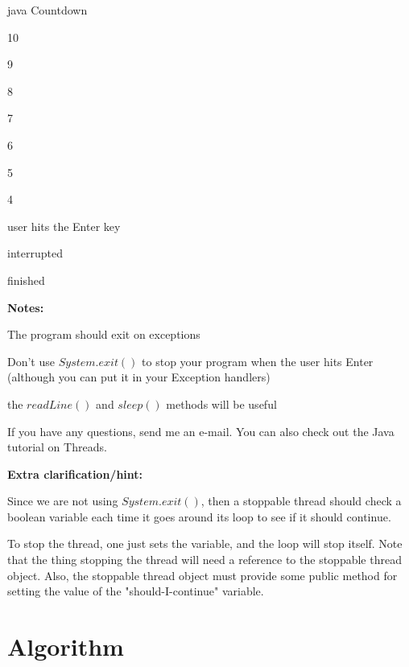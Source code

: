 \documentclass{article}
\begin{document}
java Countdown

10

9

8

7

6

5

4

user hits the Enter key

interrupted

finished

\textbf{Notes:}
\begin{compactitem}
\item The program should exit on exceptions
\item Don't use $System.exit()$ to stop your program when the user hits Enter (although you can put it in your Exception handlers)
\item the $readLine()$ and $sleep()$ methods will be useful
\item If you have any questions, send me an e-mail. You can also check out the Java tutorial on Threads.
\end{compactitem}

\textbf{Extra clarification/hint:}

Since we are not using $System.exit()$, then a stoppable thread should check a boolean variable each time it goes around its loop to see if it should continue.

To stop the thread, one just sets the variable, and the loop will stop itself. Note that the thing stopping the thread will need a reference to the stoppable thread object. Also, the stoppable thread object must provide some public method for setting the value of the "should-I-continue" variable.




\section{Algorithm}
\end{document}
